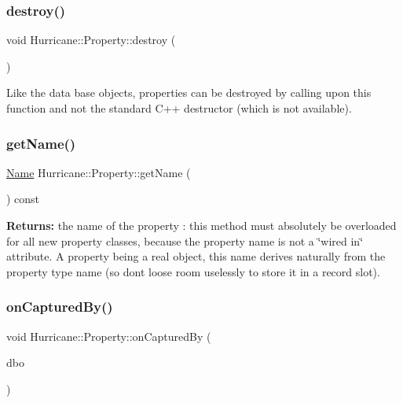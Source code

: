 \subsubsection{\texorpdfstring{destroy()}{destroy()}}
{\footnotesize\ttfamily void Hurricane\+::\+Property\+::destroy (\begin{DoxyParamCaption}{ }\end{DoxyParamCaption})\hspace{0.3cm}{\ttfamily [virtual]}}

Like the data base objects, properties can be destroyed by calling upon this function and not the standard C++ destructor (which is not available). \mbox{\label{classHurricane_1_1Property_a2759e2003c15d417b925092bc253ddd1}} 
\subsubsection{\texorpdfstring{get\+Name()}{getName()}}
{\footnotesize\ttfamily \mbox{\hyperlink{classHurricane_1_1Name}{Name}} Hurricane\+::\+Property\+::get\+Name (\begin{DoxyParamCaption}{ }\end{DoxyParamCaption}) const\hspace{0.3cm}{\ttfamily [pure virtual]}}

{\bfseries Returns\+:} the name of the property \+: this method must absolutely be overloaded for all new property classes, because the property name is not a \char`\"{}wired in\char`\"{} attribute. A property being a real object, this name derives naturally from the property type name (so don\textquotesingle{}t loose room uselessly to store it in a record slot). \mbox{\label{classHurricane_1_1Property_ac7b936414d9d85bb6509100b5dd6a667}} 
\subsubsection{\texorpdfstring{on\+Captured\+By()}{onCapturedBy()}}
{\footnotesize\ttfamily void Hurricane\+::\+Property\+::on\+Captured\+By (\begin{DoxyParamCaption}\item[{\mbox{\hyperlink{classHurricane_1_1DBo}{D\+Bo}} $\ast$}]{dbo }\end{DoxyParamCaption})\hspace{0.3cm}{\ttfamily [pure virtual]}}

